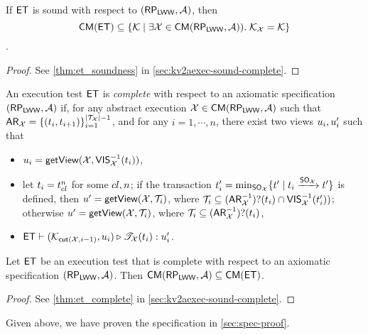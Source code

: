 \begin{theorem}
\label{thm:main-body-et_soundness}
If $\mathsf{ET}$ is sound with respect to $(\mathsf{RP}_{\mathsf{LWW}}, \mathcal{A})$, then 
\[
    \mathsf{CM}(\mathsf{ET}) \subseteq \{ \mathcal{K} \mid \exists \mathcal{X} \in \mathsf{CM}(\mathsf{RP}_{\mathsf{LWW}}, \mathcal{A})).\;\mathcal{K}_{\mathcal{X}} = \mathcal{K}\}
\].
\end{theorem}
\begin{proof}
    See \cref{thm:et_soundness} in \cref{sec:kv2aexec-sound-complete}.
\end{proof}


\begin{definition}
\label{def:main-body-et_complete}
An execution test $\mathsf{ET}$ is \emph{complete} with respect 
to an axiomatic specification $(\mathsf{RP}_{\mathsf{LWW}}, \mathcal{A})$ if, for any 
abstract execution $\mathcal{X} \in \mathsf{CM}(\mathsf{RP}_{\mathsf{LWW}}, \mathcal{A})$ 
such that $\mathsf{AR}_{\mathcal{X}} = \{(t_{i}, t_{i+1})\}_{i=1}^{\lvert \mathcal{T}_{\mathcal{X}} \rvert - 1}$, 
and for any $i=1,\cdots, n$, there exist two views $u_{i}, u_{i}'$ such that 
\begin{itemize}
\item $u_{i} = \mathsf{getView}(\mathcal{X}, \mathsf{VIS}_{\mathcal{X}}^{-1}(t_{i}))$, 
\item let $t_{i} = t_{{cl}}^{n}$ for some ${cl}, n$; if the
transaction $t_{i}' = \min_{\mathsf{SO}_{\mathcal{X}}}\{t' \mid t_i \xrightarrow{\mathsf{SO}_{\mathcal{X}}} t'\}$  
is defined, then $u' = \mathsf{getView}(\mathcal{X}, \mathcal{T}_{i})$, where $\mathcal{T}_{i} \subseteq (\mathsf{AR}_{\mathcal{X}}^{-1})?(t_{i}) \cap \mathsf{VIS}_{\mathcal{X}}^{-1}(t_{i}'))$; 
otherwise $u' = \mathsf{getView}(\mathcal{X}, \mathcal{T}_{i})$, where $\mathcal{T}_{i} \subseteq (\mathsf{AR}_{\mathcal{X}}^{-1})?(t_{i})$, 
\item $\mathsf{ET} \vdash (\mathcal{K}_{\mathsf{cut}(\mathcal{X}, i-1)}, u_{i}) \triangleright \mathscr{T}_{\mathcal{X}}(t_{i}) : u_{i}'$.
\end{itemize}
\end{definition}

\begin{theorem}
\label{thm:main-body-et_complete}
Let $\mathsf{ET}$ be an execution test that is complete with respect to 
an axiomatic specification $(\mathsf{RP}_{\mathsf{LWW}}, \mathcal{A})$. Then 
$\mathsf{CM}(\mathsf{RP}_{\mathsf{LWW}}, \mathcal{A}) \subseteq \mathsf{CM}(\mathsf{ET})$.
\end{theorem}
\begin{proof}
    See \cref{thm:et_complete} in \cref{sec:kv2aexec-sound-complete}.
\end{proof}

Given above, we have proven the specification in \cref{sec:spec-proof}.

